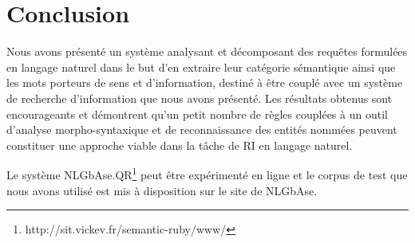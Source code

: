 \documentclass[10pt,a4paper]{article}
\begin{document}
\section{Conclusion}
\par Nous avons présenté un système analysant et décomposant des requêtes formulées en langage naturel dans le but d'en extraire leur catégorie sémantique ainsi que les mots porteurs de sens et d'information, destiné à être couplé avec un système de recherche d'information que nous avons présenté. Les résultats obtenus sont encourageants et démontrent qu'un petit nombre de règles couplées à un outil d'analyse morpho-syntaxique et de reconnaissance des entités nommées peuvent constituer une approche viable dans la tâche de RI en langage naturel.%
\par Le système NLGbAse.QR\footnote{http://sit.vickev.fr/semantic-ruby/www/} peut être expérimenté en ligne et le corpus de test que nous avons utilisé est mis à disposition sur le site de NLGbAse.




\end{document}
